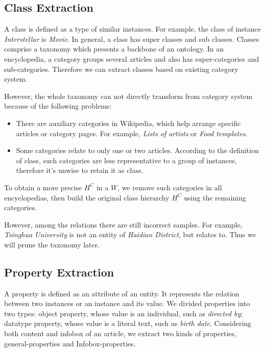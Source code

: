\documentclass[runningheads,a4paper]{llncs}
\begin{document}
\begin{CJK*}{UTF8}{song}
\subsection{Class Extraction}
\label{sec:ce}
A class is defined as a type of similar instances. For example, the class of instance \emph{Interstellar} is \emph{Movie}. In general, a class has super classes and sub classes. Classes comprise a taxonomy which presents a backbone of an ontology. In an encyclopedia, a category groups several articles and also has super-categories and sub-categories. Therefore we can extract classes based on existing category system.

However, the whole taxonomy can not directly transform from category system because of the following problems:
\begin{itemize}
    \item There are auxiliary categories in Wikipedia, which help arrange specific articles or category pages. For example, \emph{Lists of artists} or \emph{Food templates}.
    \item Some categories relate to only one or two articles. According to the definition of class, such categories are less representative to a group of instances, therefore it's unwise to retain it as class.
\end{itemize}

   To obtain a more precise $H^C$ in a $W$, we remove such categories in all encyclopedias, then build the original class hierarchy $H^C$ using the remaining categories.

However, among the relations there are still incorrect samples. For example, \emph{Tsinghua University} is not an entity of \emph{Haidian District}, but relates to. Thus we will prune the taxonomy later.

\subsection{Property Extraction}
\label{sec:pe}
A property is defined as an attribute of an entity. It represents the relation between two instances or an instance and its value. We divided properties into two types: object property, whose value is an individual, such as \emph{directed by}; datatype property, whose value is a literal text, such as \emph{birth date}. Considering both content and infobox of an article, we extract two kinds of properties, general-properties and Infobox-properties.


\end{CJK*}
\end{document}
